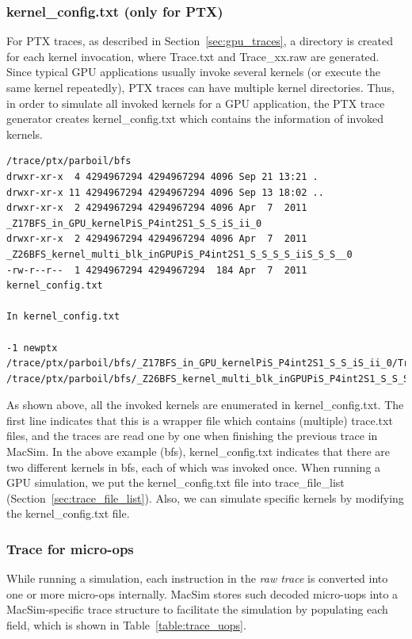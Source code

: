 \subsubsection{kernel\_config.txt (only for PTX)}

For PTX traces, as described in Section~\ref{sec:gpu_traces}, a directory is
created for each kernel invocation, where Trace.txt and Trace\_xx.raw are
generated. Since typical GPU applications usually invoke several kernels (or
    execute the same kernel repeatedly), PTX traces can have multiple kernel
directories. Thus, in order to simulate all invoked kernels for a GPU
application, the PTX trace generator creates kernel\_config.txt which contains
the information of invoked kernels.

\smallskip
\begin{lstlisting}
/trace/ptx/parboil/bfs
drwxr-xr-x  4 4294967294 4294967294 4096 Sep 21 13:21 .
drwxr-xr-x 11 4294967294 4294967294 4096 Sep 13 18:02 ..
drwxr-xr-x  2 4294967294 4294967294 4096 Apr  7  2011 _Z17BFS_in_GPU_kernelPiS_P4int2S1_S_S_iS_ii_0
drwxr-xr-x  2 4294967294 4294967294 4096 Apr  7  2011 _Z26BFS_kernel_multi_blk_inGPUPiS_P4int2S1_S_S_S_S_iiS_S_S__0
-rw-r--r--  1 4294967294 4294967294  184 Apr  7  2011 kernel_config.txt

In kernel_config.txt

-1 newptx
/trace/ptx/parboil/bfs/_Z17BFS_in_GPU_kernelPiS_P4int2S1_S_S_iS_ii_0/Trace.txt
/trace/ptx/parboil/bfs/_Z26BFS_kernel_multi_blk_inGPUPiS_P4int2S1_S_S_S_S_iiS_S_S__0/Trace.txt
\end{lstlisting}
\smallskip

As shown above, all the invoked kernels are enumerated in kernel\_config.txt.
The first line indicates that this is a wrapper file which contains (multiple) trace.txt files, and
the traces are read one by one when finishing the previous trace in MacSim.
In the above example (bfs), kernel\_config.txt indicates that there are two different
kernels in bfs, each of which was invoked once. When running a GPU simulation, we put 
the kernel\_config.txt file into trace\_file\_list (Section~\ref{sec:trace_file_list}). 
Also, we can simulate specific kernels by modifying the kernel\_config.txt file.

\subsubsection{Trace for micro-ops}

While running a simulation, each instruction in the \emph{raw trace} is converted 
into one or more micro-ops internally. MacSim stores such decoded micro-uops into a MacSim-specific
trace structure to facilitate the simulation by populating each field, which is shown 
in Table~\ref{table:trace_uops}.

